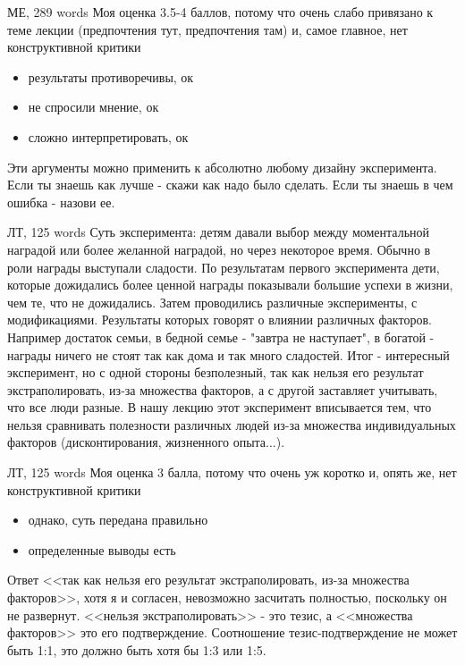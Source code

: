 \documentclass{beamer}
\begin{document}
\begin{frame}{МЕ, 289 words}
Моя оценка 3.5-4 баллов, потому что очень слабо привязано к теме лекции (предпочтения тут, предпочтения там) и, самое главное, нет конструктивной критики
\begin{itemize}
  \item результаты противоречивы, ок
  \item не спросили мнение, ок
  \item сложно интерпретировать, ок
\end{itemize}
Эти аргументы можно применить к абсолютно любому дизайну эксперимента. Если ты знаешь как лучше - скажи как надо было сделать. Если ты знаешь в чем ошибка - назови ее.

\end{frame}

\begin{frame}{ЛТ, 125 words}
\tiny
\alert{Суть эксперимента: детям давали выбор между моментальной наградой или более желанной наградой, но через некоторое время.} Обычно в роли награды выступали сладости.
\alert{По результатам первого эксперимента дети, которые дожидались более ценной награды показывали большие успехи в жизни, чем те, что не дожидались.}  
Затем проводились различные эксперименты, с модификациями. Результаты которых говорят о влиянии различных факторов. Например \alert{достаток семьи, в бедной семье - "завтра не наступает", в богатой - награды ничего не стоят так как дома и так много сладостей.}
Итог - интересный эксперимент, но с одной стороны безполезный, так как \alert{нельзя его результат экстраполировать, из-за множества факторов}, а с другой заставляет учитывать, что все люди разные. 
\alert{В нашу лекцию этот эксперимент вписывается тем, что нельзя сравнивать полезности различных людей} из-за множества индивидуальных факторов (дисконтирования, жизненного опыта...).

\end{frame}

\begin{frame}{ЛТ, 125 words}
Моя оценка 3 балла, потому что очень уж коротко и, опять же, нет конструктивной критики
\begin{itemize}
  \item однако, суть передана правильно
  \item определенные выводы есть
\end{itemize}
Ответ <<так как нельзя его результат экстраполировать, из-за множества факторов>>, хотя я и согласен, невозможно засчитать полностью, поскольку он не развернут. <<нельзя экстраполировать>> - это тезис, а <<множества факторов>> это его подтверждение. Соотношение тезис-подтверждение не может быть 1:1, это должно быть хотя бы 1:3 или 1:5.
\end{frame}
\end{document}
